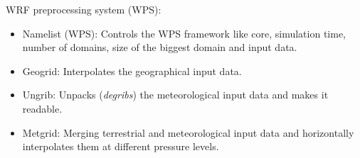 \documentclass{beamer}
\begin{document}
\begin{frame}
\begin{center}
{
	}%
\end{center}
WRF preprocessing system (WPS):
\begin{itemize}
	\item Namelist (WPS): Controls the WPS framework like core, simulation time, number of domains, size of the biggest domain and input data.
	\item Geogrid: Interpolates the geographical input data.
	\item Ungrib: Unpacks (\textit{degribs}) the meteorological input data and makes it readable.
	\item Metgrid: Merging terrestrial and meteorological input data and horizontally interpolates them at different pressure levels.
\end{itemize}
\end{frame}
\end{document}
